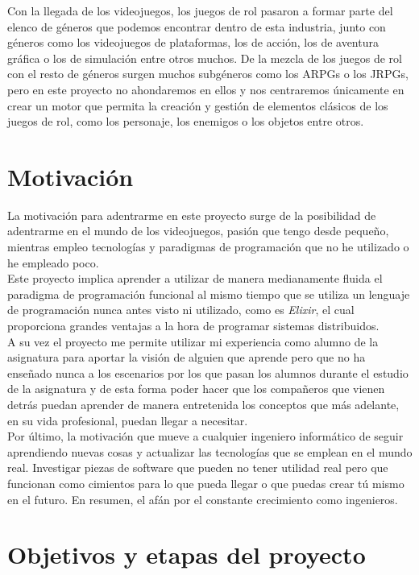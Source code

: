 Con la llegada de los videojuegos, los juegos de rol pasaron a formar parte del elenco de géneros que podemos encontrar dentro de esta industria, junto con géneros como los videojuegos de plataformas, los de acción, los de aventura gráfica o los de simulación entre otros muchos. De la mezcla de los juegos de rol con el resto de géneros surgen muchos subgéneros como los ARPGs o los JRPGs, pero en este proyecto no ahondaremos en ellos y nos centraremos únicamente en crear un motor que permita la creación y gestión de elementos clásicos de los juegos de rol, como los personaje, los enemigos o los objetos entre otros.

\section{Motivación}
La motivación para adentrarme en este proyecto surge de la posibilidad de adentrarme en el mundo de los videojuegos, pasión que tengo desde pequeño, mientras empleo tecnologías y paradigmas de programación que no he utilizado o he empleado poco.
\\

Este proyecto implica aprender a utilizar de manera medianamente fluida el paradigma de programación funcional al mismo tiempo que se utiliza un lenguaje de programación nunca antes visto ni utilizado, como es \textit{Elixir}, el cual proporciona grandes ventajas a la hora de programar sistemas distribuidos.
\\

A su vez el proyecto me permite utilizar mi experiencia como alumno de la asignatura para aportar la visión de alguien que aprende pero que no ha enseñado nunca a los escenarios por los que pasan los alumnos durante el estudio de la asignatura y de esta forma poder hacer que los compañeros que vienen detrás puedan aprender de manera entretenida los conceptos que más adelante, en su vida profesional, puedan llegar a necesitar.
\\

Por último, la motivación que mueve a cualquier ingeniero informático de seguir aprendiendo nuevas cosas y actualizar las tecnologías que se emplean en el mundo real. Investigar piezas de software que pueden no tener utilidad real pero que funcionan como cimientos para lo que pueda llegar o que puedas crear tú mismo en el futuro. En resumen, el afán por el constante crecimiento como ingenieros.

\section{Objetivos y etapas del proyecto}
